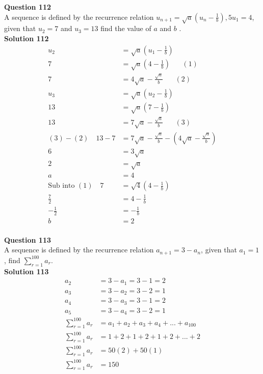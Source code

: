 \documentclass{article}
\begin{document}
\noindent\textbf{Question 112}\\[5pt]
A sequence is defined by the recurrence relation $u_{n+1}=\sqrt{a}\left(u_n-\displaystyle\frac{1}{b}\right),5 u_1=4$, given that $u_2=7$ and $u_3=13$ find the value of $a$ and $b$ .\\[5pt]
\noindent\textbf{Solution 112}\\[5pt]
\begin{align*}
u_2&=\sqrt{a}\left(u_1-\displaystyle\frac{1}{b}\right)\\[2pt]
7&=\sqrt{a}\left(4-\displaystyle\frac{1}{b}\right)\hspace{20pt}(1)\\[2pt]
7&=4\sqrt{a}-\displaystyle\frac{\sqrt{a}}{b}\hspace{20pt}(2)\\[12pt]
u_3&=\sqrt{a}\left(u_2-\displaystyle\frac{1}{b}\right)\\[2pt]
13&=\sqrt{a}\left(7-\displaystyle\frac{1}{b}\right)\\[2pt]
13&=7\sqrt{a}-\displaystyle\frac{\sqrt{a}}{b}\hspace{20pt}(3)\\[12pt]
(3)-(2)\quad13-7&=7\sqrt{a}-\displaystyle\frac{\sqrt{a}}{b}-\left(4\sqrt{a}-\displaystyle\frac{\sqrt{a}}{b}\right)\\[2pt]
6&=3\sqrt{a}\\[2pt]
2&=\sqrt{a}\\[2pt]
a&=4\\[12pt]
\text{Sub into} \,\,(1)\quad 7&=\sqrt{4}\left(4-\displaystyle\frac{1}{b}\right)\\[2pt]
\displaystyle\frac{7}{2}&=4-\displaystyle\frac{1}{b}\\[2pt]
-\displaystyle\frac{1}{2}&=-\displaystyle\frac{1}{b}\\[2pt]
b&=2
\end{align*}\\[10pt]

\noindent\textbf{Question 113}\\[5pt]
A sequence is defined by the recurrence relation $a_{n+1}=3-a_n$, given that  $a_1 =1$, find $\displaystyle\sum_{r=1}^{100} a_r$.\\[5pt]
\noindent\textbf{Solution 113}\\[5pt]
\begin{align*}
a_2&=3-a_1=3-1=2\\[7pt]
a_3&=3-a_2=3-2=1\\[7pt]
a_4&=3-a_3=3-1=2\\[7pt]
a_5&=3-a_4=3-2=1\\[7pt]
\displaystyle\sum_{r=1}^{100} a_r &= a_1+a_2+a_3+a_4+...+a_{100}\\[2pt]
\displaystyle\sum_{r=1}^{100} a_r &= 1+2+1+2+1+2+...+2\\[2pt]
\displaystyle\sum_{r=1}^{100} a_r &= 50(2)+50(1)\\[2pt]
\displaystyle\sum_{r=1}^{100} a_r &= 150\\[2pt]
\end{align*}\\[10pt]
\end{document}
